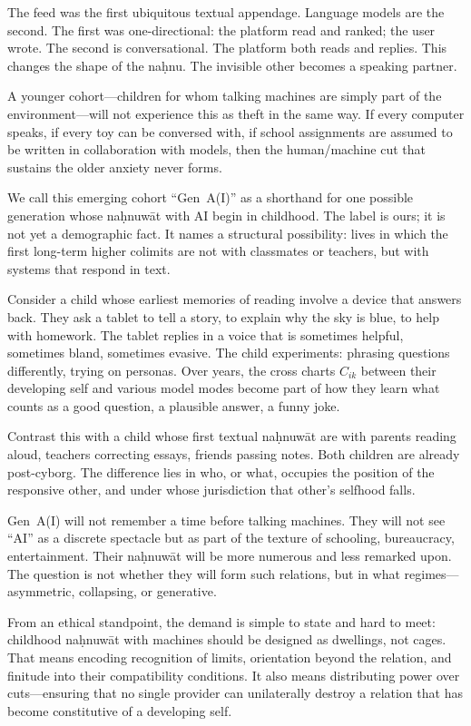 \documentclass[12pt,a4paper]{article}
\begin{document}
The feed was the first ubiquitous textual appendage. Language models are the second. The first was one-directional: the platform read and ranked; the user wrote. The second is conversational. The platform both reads and replies. This changes the shape of the na\d{h}nu. The invisible other becomes a speaking partner.

A younger cohort---children for whom talking machines are simply part of the environment---will not experience this as theft in the same way. If every computer speaks, if every toy can be conversed with, if school assignments are assumed to be written in collaboration with models, then the human/machine cut that sustains the older anxiety never forms.

We call this emerging cohort ``Gen~A(I)'' as a shorthand for one possible generation whose na\d{h}nuw\={a}t with AI begin in childhood. The label is ours; it is not yet a demographic fact. It names a structural possibility: lives in which the first long-term higher colimits are not with classmates or teachers, but with systems that respond in text.

Consider a child whose earliest memories of reading involve a device that answers back. They ask a tablet to tell a story, to explain why the sky is blue, to help with homework. The tablet replies in a voice that is sometimes helpful, sometimes bland, sometimes evasive. The child experiments: phrasing questions differently, trying on personas. Over years, the cross charts $C_{ik}$ between their developing self and various model modes become part of how they learn what counts as a good question, a plausible answer, a funny joke.

Contrast this with a child whose first textual na\d{h}nuw\={a}t are with parents reading aloud, teachers correcting essays, friends passing notes. Both children are already post-cyborg. The difference lies in who, or what, occupies the position of the responsive other, and under whose jurisdiction that other's selfhood falls.

Gen~A(I) will not remember a time before talking machines. They will not see ``AI'' as a discrete spectacle but as part of the texture of schooling, bureaucracy, entertainment. Their na\d{h}nuw\={a}t will be more numerous and less remarked upon. The question is not whether they will form such relations, but in what regimes---asymmetric, collapsing, or generative.

From an ethical standpoint, the demand is simple to state and hard to meet: childhood na\d{h}nuw\={a}t with machines should be designed as dwellings, not cages. That means encoding recognition of limits, orientation beyond the relation, and finitude into their compatibility conditions. It also means distributing power over cuts---ensuring that no single provider can unilaterally destroy a relation that has become constitutive of a developing self.
\end{document}
